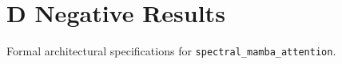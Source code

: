 \section{D Negative Results}

Formal architectural specifications for \texttt{spectral_mamba_attention}.
